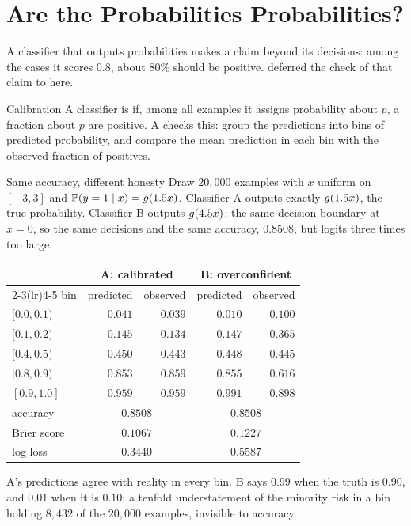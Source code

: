\section{Are the Probabilities Probabilities?}
\label{sec:calibration}

A classifier that outputs probabilities makes a claim beyond its decisions:
among the cases it scores $0.8$, about $80\%$ should be positive.
 deferred the check of that claim to here.

\begin{defbox}{Calibration}
A classifier is  if, among all examples it assigns probability
about $p$, a fraction about $p$ are positive. A  checks
this: group the predictions into bins of predicted probability, and compare the
mean prediction in each bin with the observed fraction of positives.
\end{defbox}

\begin{workedexample}{Same accuracy, different honesty}
Draw $20{,}000$ examples with $x$ uniform on $[-3,3]$ and
$\mathbb{P}(y = 1\mid x) = g(1.5x)$. Classifier A outputs exactly
$g(1.5x)$, the true probability. Classifier B outputs $g(4.5x)$: the
same decision boundary at $x = 0$, so the same decisions and the same accuracy,
$0.8508$, but logits three times too large.

\begin{center}
\small
\renewcommand{\arraystretch}{1.12}
\begin{tabular}{@{}lrrrr@{}}
\toprule
 & \multicolumn{2}{c}{A: calibrated} & \multicolumn{2}{c}{B: overconfident}\\
\cmidrule(lr){2-3}\cmidrule(lr){4-5}
bin & predicted & observed & predicted & observed\\
\midrule
$[0.0, 0.1)$ & $0.041$ & $0.039$ & $0.010$ & $0.100$\\
$[0.1, 0.2)$ & $0.145$ & $0.134$ & $0.147$ & $0.365$\\
$[0.4, 0.5)$ & $0.450$ & $0.443$ & $0.448$ & $0.445$\\
$[0.8, 0.9)$ & $0.853$ & $0.859$ & $0.855$ & $0.616$\\
$[0.9, 1.0]$ & $0.959$ & $0.959$ & $0.991$ & $0.898$\\
\midrule
accuracy   & \multicolumn{2}{c}{$0.8508$} & \multicolumn{2}{c}{$0.8508$}\\
Brier score & \multicolumn{2}{c}{$0.1067$} & \multicolumn{2}{c}{$0.1227$}\\
log loss    & \multicolumn{2}{c}{$0.3440$} & \multicolumn{2}{c}{$0.5587$}\\
\bottomrule
\end{tabular}
\end{center}

A's predictions agree with reality in every bin. B says $0.99$ when the truth is
$0.90$, and $0.01$ when it is $0.10$: a tenfold understatement of the minority
risk in a bin holding $8{,}432$ of the $20{,}000$ examples, invisible to
accuracy.
\end{workedexample}

